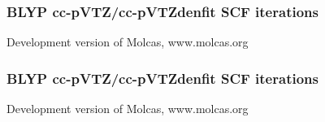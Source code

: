 \begin{frame}
   \frametitle{BLYP cc-pVTZ/cc-pVTZdenfit SCF iterations}
   \tiny{Development version of Molcas, www.molcas.org}
    \begin{center}
        \begin{figure}
        \end{figure}
    \end{center}
\end{frame}

\begin{frame}
   \frametitle{BLYP cc-pVTZ/cc-pVTZdenfit SCF iterations}
   \tiny{Development version of Molcas, www.molcas.org}
    \begin{center}
        \begin{figure}
        \end{figure}
    \end{center}
\end{frame}

